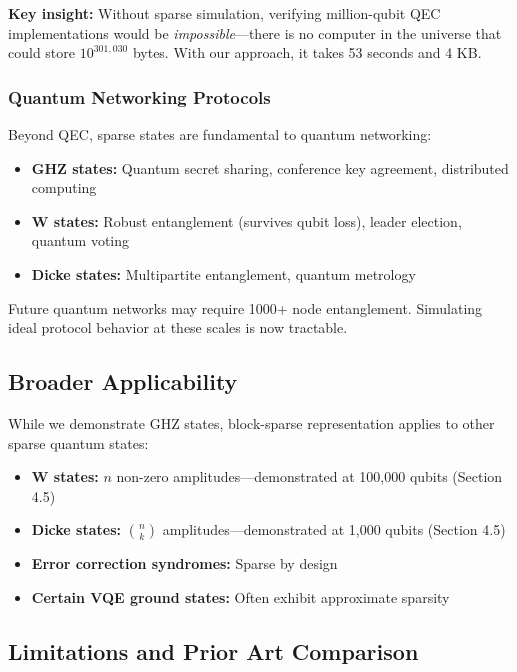\documentclass[11pt,twocolumn]{article}
\begin{document}
\textbf{Key insight:} Without sparse simulation, verifying million-qubit QEC implementations would be \emph{impossible}---there is no computer in the universe that could store $10^{301,030}$ bytes. With our approach, it takes 53 seconds and 4 KB.

\subsubsection{Quantum Networking Protocols}

Beyond QEC, sparse states are fundamental to quantum networking:
\begin{itemize}
    \item \textbf{GHZ states:} Quantum secret sharing, conference key agreement, distributed computing
    \item \textbf{W states:} Robust entanglement (survives qubit loss), leader election, quantum voting
    \item \textbf{Dicke states:} Multipartite entanglement, quantum metrology
\end{itemize}

Future quantum networks may require 1000+ node entanglement. Simulating ideal protocol behavior at these scales is now tractable.

\subsection{Broader Applicability}

While we demonstrate GHZ states, block-sparse representation applies to other sparse quantum states:

\begin{itemize}
    \item \textbf{W states:} $n$ non-zero amplitudes---demonstrated at 100,000 qubits (Section 4.5)
    \item \textbf{Dicke states:} $\binom{n}{k}$ amplitudes---demonstrated at 1,000 qubits (Section 4.5)
    \item \textbf{Error correction syndromes:} Sparse by design
    \item \textbf{Certain VQE ground states:} Often exhibit approximate sparsity
\end{itemize}

\subsection{Limitations and Prior Art Comparison}
\end{document}
